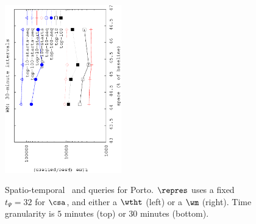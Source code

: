 \begin{figure}[!ht]
\begin{center}
		{\includegraphics[angle=-90,width=0.45\textwidth]{figures_synt/porto_st_topk_wm_30.eps}}
		
	\end{center}
	\vspace{-0.3cm}
	\caption{Spatio-temporal {\Stk\ and \Stks} queries for Porto. $\repres$ uses a fixed $t_{\Psi}=32$ for $\csa$, 
		and either a $\wtht$ (left) or a $\wm$ (right). 
		Time granularity is $5$ minutes (top) or $30$ minutes (bottom). 
	}
	\label{fig:portost.tk}
	\vspace{-0.3cm}
\end{figure}






